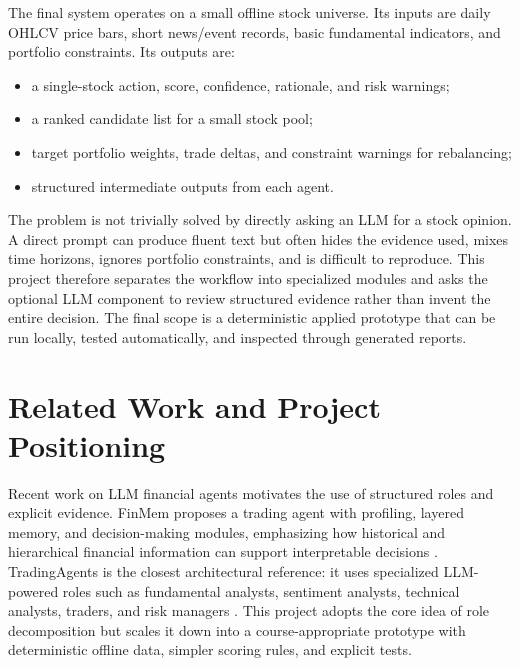 \documentclass{article}
\begin{document}
The final system operates on a small offline stock universe. Its inputs are daily OHLCV price bars, short news/event records, basic fundamental indicators, and portfolio constraints. Its outputs are:

\begin{itemize}[leftmargin=*]
  \item a single-stock action, score, confidence, rationale, and risk warnings;
  \item a ranked candidate list for a small stock pool;
  \item target portfolio weights, trade deltas, and constraint warnings for rebalancing;
  \item structured intermediate outputs from each agent.
\end{itemize}

The problem is not trivially solved by directly asking an LLM for a stock opinion. A direct prompt can produce fluent text but often hides the evidence used, mixes time horizons, ignores portfolio constraints, and is difficult to reproduce. This project therefore separates the workflow into specialized modules and asks the optional LLM component to review structured evidence rather than invent the entire decision. The final scope is a deterministic applied prototype that can be run locally, tested automatically, and inspected through generated reports.

\section{Related Work and Project Positioning}

Recent work on LLM financial agents motivates the use of structured roles and explicit evidence. FinMem proposes a trading agent with profiling, layered memory, and decision-making modules, emphasizing how historical and hierarchical financial information can support interpretable decisions \citep{yu2023finmem}. TradingAgents is the closest architectural reference: it uses specialized LLM-powered roles such as fundamental analysts, sentiment analysts, technical analysts, traders, and risk managers \citep{xiao2024tradingagents}. This project adopts the core idea of role decomposition but scales it down into a course-appropriate prototype with deterministic offline data, simpler scoring rules, and explicit tests.
\end{document}
